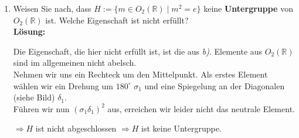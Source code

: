 \documentclass[11pt,a4paper,ngerman]{article}
\newcommand{\R}{\mathbb{R}}
\begin{document}
\begin{enumerate}[\bfseries a)]
\pagebreak

\item Weisen Sie nach, dass $H := \{ m \in O_2 (\R ) \; | \; m^2 = e \}$ keine \textbf{Untergruppe} von $O_2 (\R ) $ ist. Welche Eigenschaft ist nicht erfüllt?\\

\textbf{Lösung:}

Die Eigenschaft, die hier nicht erfüllt ist, ist die aus \emph{b)}. Elemente aus $O_2 (\R)$ sind im allgemeinen nicht abelsch.\\
Nehmen wir uns ein Rechteck um den Mittelpunkt. Als erstes Element wählen wir ein Drehung um $180^\circ$ $\sigma_1$ und eine Spiegelung an der Diagonalen (siehe Bild) $\delta_1$.\\

Führen wir nun $(\sigma_1 \delta_1)^2$ aus, erreichen wir leider nicht das neutrale Element.\\

\vspace{15cm}

$\Rightarrow H$ ist nicht abgeschlossen $\Rightarrow H$ ist keine Untergruppe. 

\end{enumerate}

\label{LastPage}
\end{document}
